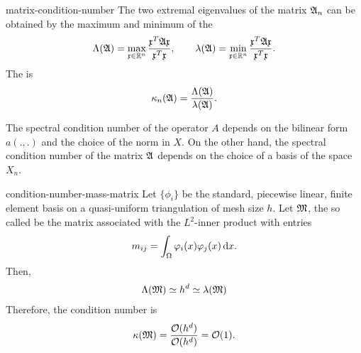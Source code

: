 \begin{Definition}{matrix-condition-number}
  The two extremal eigenvalues of the matrix $\mathfrak{A}_n$ can be
  obtained by the maximum and minimum of the 
  \begin{gather}
    \label{eq:itintro:3}
    \Lambda(\mathfrak{A}) = \max_{\mathfrak{x}\in \mathbb R^n}\frac{\mathfrak{x}^T \mathfrak{A} \mathfrak{x}}{\mathfrak{x}^T\mathfrak{x}},
    \qquad
    \lambda(\mathfrak{A}) = \min_{\mathfrak{x}\in \mathbb R^n}\frac{\mathfrak{x}^T \mathfrak{A} \mathfrak{x}}{\mathfrak{x}^T\mathfrak{x}}.
  \end{gather}
  The  is
  \begin{gather*}
    \kappa_n(\mathfrak{A}) = \frac{\Lambda(\mathfrak{A})}{\lambda(\mathfrak{A})}.
  \end{gather*}
\end{Definition}

\begin{note}
  The spectral condition number of the operator $A$ depends on the
  bilinear form $a(.,.)$ and the choice of the norm in $X$. On the
  other hand, the spectral condition number of the matrix $\mathfrak{A}$
  depends on the choice of a basis of the space $X_n$.
\end{note}

\begin{Lemma}{condition-number-mass-matrix}
  \label{lemma:itintro:1}
  Let $\{\phi_i\}$ be the standard, piecewise linear, finite element
  basis on a quasi-uniform triangulation of mesh size $h$. Let $\mathfrak{M}$, the so called  be the matrix associated with
  the $L^2$-inner product with entries
  \begin{gather*}
    m_{ij} = \int_\Omega \varphi_i(x) \varphi_j(x) \,\mathrm{d} x.
  \end{gather*}
  Then,
  \begin{gather*}
    \Lambda(\mathfrak{M}) \simeq h^{d} \simeq  \lambda(\mathfrak{M})
  \end{gather*}
  Therefore, the condition number is
  \begin{gather*}
    \kappa(\mathfrak{M}) = \frac{\mathcal O(h^{d})}{\mathcal O(h^{d})} = {\mathcal O(1)}.
  \end{gather*}
\end{Lemma}


